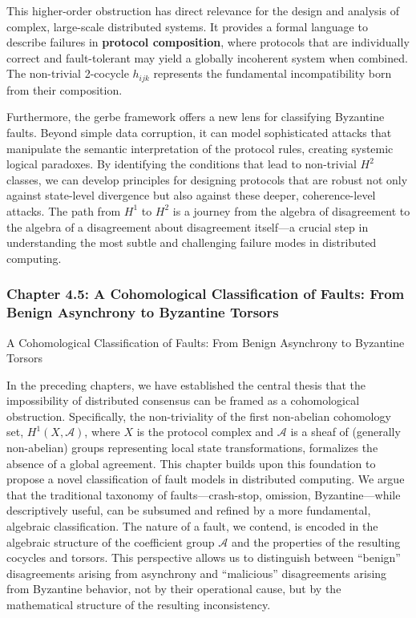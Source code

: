 \documentclass[
]{article}
\begin{document}
This higher-order obstruction has direct relevance for the design and
analysis of complex, large-scale distributed systems. It provides a
formal language to describe failures in \textbf{protocol composition},
where protocols that are individually correct and fault-tolerant may
yield a globally incoherent system when combined. The non-trivial
2-cocycle \(h_{ijk}\) represents the fundamental incompatibility born
from their composition.

Furthermore, the gerbe framework offers a new lens for classifying
Byzantine faults. Beyond simple data corruption, it can model
sophisticated attacks that manipulate the semantic interpretation of the
protocol rules, creating systemic logical paradoxes. By identifying the
conditions that lead to non-trivial \(H^2\) classes, we can develop
principles for designing protocols that are robust not only against
state-level divergence but also against these deeper, coherence-level
attacks. The path from \(H^1\) to \(H^2\) is a journey from the algebra
of disagreement to the algebra of a disagreement about disagreement
itself---a crucial step in understanding the most subtle and challenging
failure modes in distributed computing.

\subsubsection{Chapter 4.5: A Cohomological Classification of Faults:
From Benign Asynchrony to Byzantine
Torsors}\label{chapter-4.5-a-cohomological-classification-of-faults-from-benign-asynchrony-to-byzantine-torsors}

\protect{}\label{chapter-4-5-A_Cohomological_Classification_of_Faults}{}

A Cohomological Classification of Faults: From Benign Asynchrony to
Byzantine Torsors

In the preceding chapters, we have established the central thesis that
the impossibility of distributed consensus can be framed as a
cohomological obstruction. Specifically, the non-triviality of the first
non-abelian cohomology set, \(H^1(X, \mathcal{A})\), where \(X\) is the
protocol complex and \(\mathcal{A}\) is a sheaf of (generally
non-abelian) groups representing local state transformations, formalizes
the absence of a global agreement. This chapter builds upon this
foundation to propose a novel classification of fault models in
distributed computing. We argue that the traditional taxonomy of
faults---crash-stop, omission, Byzantine---while descriptively useful,
can be subsumed and refined by a more fundamental, algebraic
classification. The nature of a fault, we contend, is encoded in the
algebraic structure of the coefficient group \(\mathcal{A}\) and the
properties of the resulting cocycles and torsors. This perspective
allows us to distinguish between ``benign'' disagreements arising from
asynchrony and ``malicious'' disagreements arising from Byzantine
behavior, not by their operational cause, but by the mathematical
structure of the resulting inconsistency.
\end{document}
